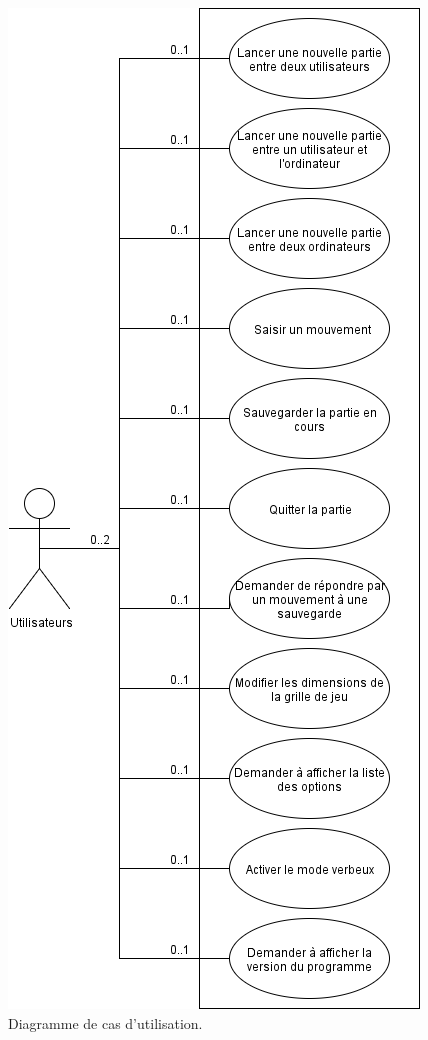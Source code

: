 \documentclass[10pt,a4paper]{article}
\begin{document}
\begin{figure}[H]
\centering
\includegraphics[scale=0.5]{images/use_case.png}
\caption{Diagramme de cas d'utilisation.\label{fig:use_case}}
\end{figure}
\end{document}
